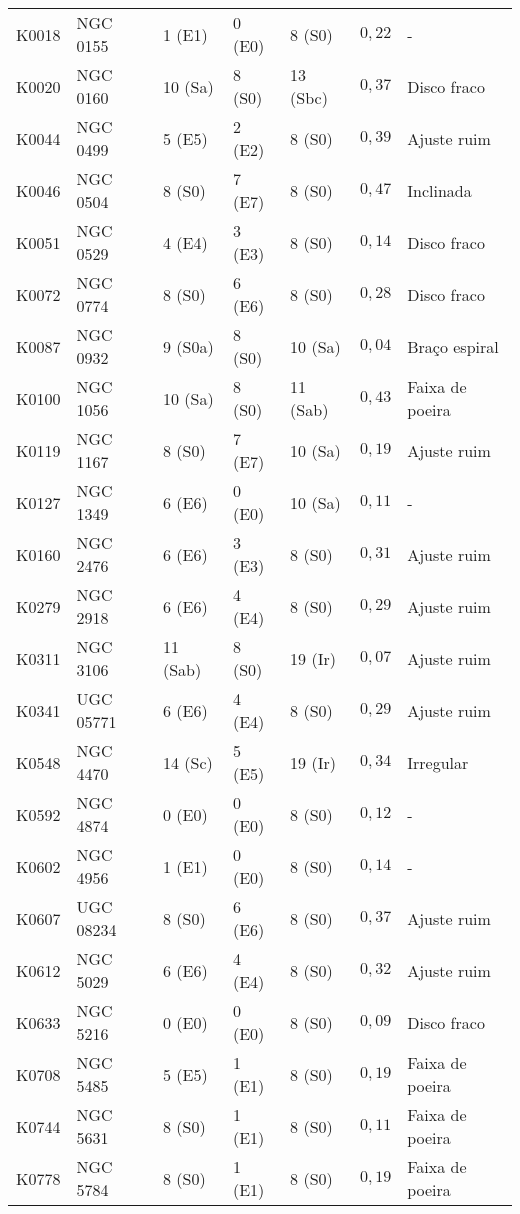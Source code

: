 \begin{longtable}{ l l l l l l l }
K0018 & NGC 0155  &  1 (E1)  & 0 (E0) &  8 (S0)  & $0,22$ & - \\
K0020 & NGC 0160  & 10 (Sa)  & 8 (S0) & 13 (Sbc) & $0,37$ & Disco fraco \\
K0044 & NGC 0499  &  5 (E5)  & 2 (E2) &  8 (S0)  & $0,39$ & Ajuste ruim \\
K0046 & NGC 0504  &  8 (S0)  & 7 (E7) &  8 (S0)  & $0,47$ & Inclinada \\
K0051 & NGC 0529  &  4 (E4)  & 3 (E3) &  8 (S0)  & $0,14$ & Disco fraco \\
K0072 & NGC 0774  &  8 (S0)  & 6 (E6) &  8 (S0)  & $0,28$ & Disco fraco \\
K0087 & NGC 0932  &  9 (S0a) & 8 (S0) & 10 (Sa)  & $0,04$ & Braço espiral \\
K0100 & NGC 1056  & 10 (Sa)  & 8 (S0) & 11 (Sab) & $0,43$ & Faixa de poeira \\
K0119 & NGC 1167  &  8 (S0)  & 7 (E7) & 10 (Sa)  & $0,19$ & Ajuste ruim \\
K0127 & NGC 1349  &  6 (E6)  & 0 (E0) & 10 (Sa)  & $0,11$ & - \\
K0160 & NGC 2476  &  6 (E6)  & 3 (E3) &  8 (S0)  & $0,31$ & Ajuste ruim \\
K0279 & NGC 2918  &  6 (E6)  & 4 (E4) &  8 (S0)  & $0,29$ & Ajuste ruim \\
K0311 & NGC 3106  & 11 (Sab) & 8 (S0) & 19 (Ir)  & $0,07$ & Ajuste ruim \\
K0341 & UGC 05771 &  6 (E6)  & 4 (E4) &  8 (S0)  & $0,29$ & Ajuste ruim \\
K0548 & NGC 4470  & 14 (Sc)  & 5 (E5) & 19 (Ir)  & $0,34$ & Irregular \\
K0592 & NGC 4874  &  0 (E0)  & 0 (E0) &  8 (S0)  & $0,12$ & - \\
K0602 & NGC 4956  &  1 (E1)  & 0 (E0) &  8 (S0)  & $0,14$ & - \\
K0607 & UGC 08234 &  8 (S0)  & 6 (E6) &  8 (S0)  & $0,37$ & Ajuste ruim \\
K0612 & NGC 5029  &  6 (E6)  & 4 (E4) &  8 (S0)  & $0,32$ & Ajuste ruim \\
K0633 & NGC 5216  &  0 (E0)  & 0 (E0) &  8 (S0)  & $0,09$ & Disco fraco \\
K0708 & NGC 5485  &  5 (E5)  & 1 (E1) &  8 (S0)  & $0,19$ & Faixa de poeira \\
K0744 & NGC 5631  &  8 (S0)  & 1 (E1) &  8 (S0)  & $0,11$ & Faixa de poeira \\
K0778 & NGC 5784  &  8 (S0)  & 1 (E1) &  8 (S0)  & $0,19$ & Faixa de poeira \\

\end{longtable}
